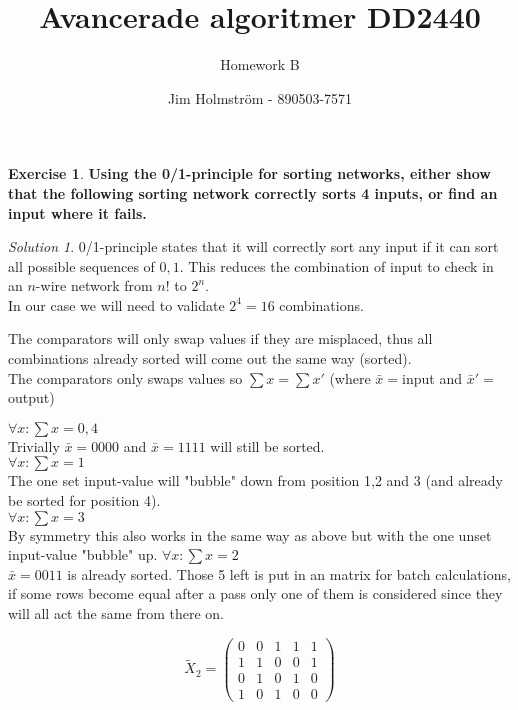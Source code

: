 \documentclass[a4paper,twoside=false,abstract=false,numbers=noenddot,
titlepage=false,headings=small,parskip=half,version=last]{scrartcl}
\author{Jim Holmström - 890503-7571}
\title{Avancerade algoritmer DD2440}
\subtitle{Homework B}
\theoremstyle{definition}
\newtheorem{exercise}{Exercise}
\theoremstyle{remark}
\newtheorem*{solution}{Solution}
\begin{document}
\maketitle
\thispagestyle{empty}

\begin{exercise}
{\bf
Using the 0/1-principle for sorting networks, either show that the following
sorting network correctly sorts 4 inputs, or find an input where it fails.
}
\end{exercise}
\begin{solution}
0/1-principle states that it will correctly sort any input if it can sort all
possible sequences of ${0,1}$. This reduces the combination of input to check
in an $n$-wire network from $n!$ to $2^n$.\\
In our case we will need to validate $2^4=16$ combinations.

The comparators will only swap values if they are misplaced, thus all
combinations already sorted will come out the same way (sorted).\\

The comparators only swaps values so $\sum{x}=\sum{x'}$ (where $\bar{x}=$input
and $\bar{x}'=$output)

$\forall x : \sum{x}=0,4$\\
Trivially $\bar{x}=0000$ and $\bar{x}=1111$ will still be sorted.\\
$\forall x : \sum{x}=1$\\
The one set input-value will "bubble" down from position 1,2 and 3 (and already be
sorted for position 4).\\ 
$\forall x : \sum{x}=3$\\
By symmetry this also works in the same way as above but with the one unset input-value "bubble" up.
$\forall x : \sum{x}=2$\\
    $\bar{x}=0011$ is already sorted. Those 5 left is put in an matrix for
    batch calculations, if some rows become equal after a pass only one of them is
    considered since they will all act the same from there on.
    
    \begin{equation*}
        \tilde{X}_2= 
        \left(
        \begin{matrix}
            
                                     0 & 0 & 1 & 1 & 1 \\
                                     1 & 1 & 0 & 0 & 1 \\
                                     0 & 1 & 0 & 1 & 0 \\
                                     1 & 0 & 1 & 0 & 0
       \end{matrix}
       \right)
    \end{equation*}
    

\end{solution}
\end{document}

